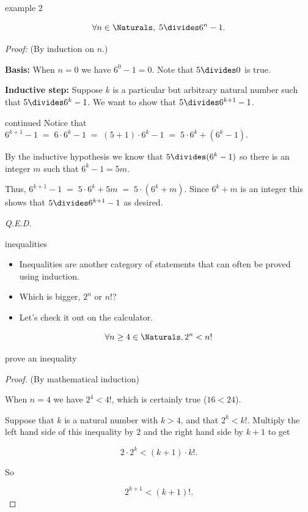 \documentclass[handout,landscape]{beamer}
\begin{document}
\begin{frame}{example 2}
\begin{thm*}
\[ \forall n\in \Naturals, \; 5 \divides 6^n-1. \]
\end{thm*}

\pause
{\em Proof:} (By induction on $n$.) \pause

{\bf Basis:} When $n=0$ we have $6^0-1 = 0$.  Note that $5 \divides 0$ is true. \pause

{\bf Inductive step:} Suppose $k$ is a particular but arbitrary natural number such that $5 \divides 6^k-1 $.
We want to show that $5 \divides 6^{k+1}-1 $.
\end{frame}

\begin{frame}{continued}
Notice that $6^{k+1}-1 \; = \; 6 \cdot 6^k -1 \; = \; (5+1) \cdot 6^k -1 \; = \; 5 \cdot 6^k + (6^k - 1)$.
\pause

By the inductive hypothesis we know that $5 \divides (6^k - 1)$ so there is an integer $m$ such that $6^k - 1 = 5m$.
\pause

Thus, $6^{k+1}-1 \; = \; 5 \cdot 6^k + 5m \; = \; 5 \cdot (6^k + m)$. \pause Since $6^k + m$ is an integer this shows that
$5 \divides 6^{k+1}-1$ as desired.
\pause 

\hfill {\em Q.E.D.} 
\end{frame}

\begin{frame}{inequalities}
\begin{itemize}
\item Inequalities are another category of statements that can often be proved using induction.\pause
\item Which is bigger, $2^n$ or $n!$? \pause
\item Let's check it out on the calculator.\pause
\end{itemize}

\begin{thm*} 
\[ \forall n \geq 4 \in \Naturals, 2^n < n! \]
\end{thm*}

\end{frame}

\begin{frame}{prove an inequality}
\begin{proof} (By mathematical induction)

 When $n=4$ we have $2^4 < 4!$, which is certainly 
true ($16 < 24$). \pause

 Suppose that $k$ is a natural number 
with $k > 4$, and that $2^k < k!$.  \pause Multiply the left hand side of this
inequality by $2$ and the right hand side by $k+1$ to get \pause

\[ 2\cdot 2^{k} < (k+1) \cdot k!. \]

\noindent So

\[ 2^{k+1} < (k+1)!. \]

\end{proof}
\end{frame}
\end{document}
